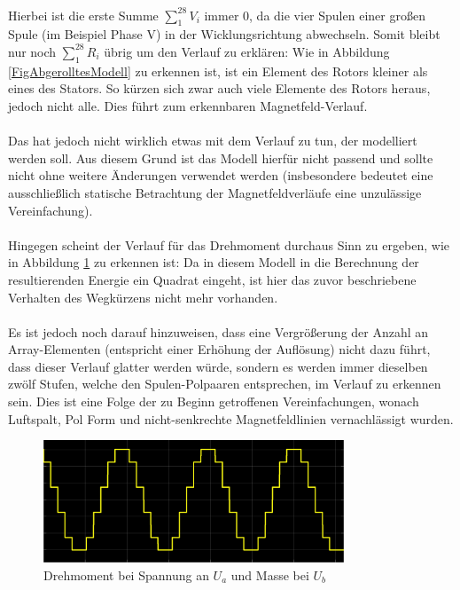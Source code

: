\paragraph{}
Hierbei ist die erste Summe $\sum \limits_1^{28} V_i$ immer 0, da die vier Spulen einer großen Spule (im Beispiel Phase V) in der Wicklungsrichtung abwechseln. 
Somit bleibt nur noch $\sum \limits_1^{28} R_i$ übrig um den Verlauf zu erklären: Wie in Abbildung \ref{FigAbgerolltesModell} zu erkennen ist, ist ein Element des Rotors kleiner als eines des Stators. So kürzen sich zwar auch viele Elemente des Rotors heraus, jedoch nicht alle. Dies führt zum erkennbaren Magnetfeld-Verlauf. 

\paragraph{}
Das hat jedoch nicht wirklich etwas mit dem Verlauf zu tun, der modelliert werden soll. Aus diesem Grund ist das Modell hierfür nicht passend und sollte nicht ohne weitere Änderungen verwendet werden (insbesondere bedeutet eine ausschließlich statische Betrachtung der Magnetfeldverläufe eine unzulässige Vereinfachung).

\paragraph{}
Hingegen scheint der Verlauf für das Drehmoment durchaus Sinn zu ergeben, wie in Abbildung \ref{FigDrehmoment} zu erkennen ist: Da in diesem Modell in die Berechnung der resultierenden Energie ein Quadrat eingeht, ist hier das zuvor beschriebene Verhalten des Wegkürzens nicht mehr vorhanden. 

\paragraph{}
Es ist jedoch noch darauf hinzuweisen, dass eine Vergrößerung der Anzahl an Array-Elementen (entspricht einer Erhöhung der Auflösung) nicht dazu führt, dass dieser Verlauf glatter werden würde, sondern es werden immer dieselben zwölf Stufen, welche den Spulen-Polpaaren entsprechen, im Verlauf zu erkennen sein.
Dies ist eine Folge der zu Beginn getroffenen Vereinfachungen, wonach Luftspalt, Pol Form und nicht-senkrechte Magnetfeldlinien vernachlässigt wurden.

\begin{figure}[htbp]
	\centering
	\includegraphics[width=0.8\textwidth]{./sim/pictures/drehmoment.png}
	\caption{Drehmoment bei Spannung an $U_a$ und Masse bei $U_b$}
	\label{FigDrehmoment}
\end{figure}

